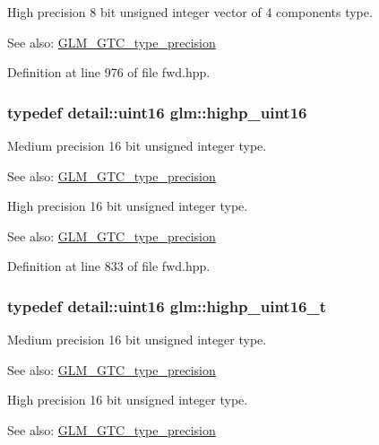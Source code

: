 High precision 8 bit unsigned integer vector of 4 components type. \begin{Desc}
\item[See also:]\hyperlink{group__gtc__type__precision}{GLM\_\-GTC\_\-type\_\-precision} \end{Desc}


Definition at line 976 of file fwd.hpp.\hypertarget{group__gtc__type__precision_g4d32967d45ba8365e2a05eaaac85e978}{
\subsubsection[highp\_\-uint16]{\setlength{\rightskip}{0pt plus 5cm}typedef detail::uint16 {\bf glm::highp\_\-uint16}}}
\label{group__gtc__type__precision_g4d32967d45ba8365e2a05eaaac85e978}


Medium precision 16 bit unsigned integer type. \begin{Desc}
\item[See also:]\hyperlink{group__gtc__type__precision}{GLM\_\-GTC\_\-type\_\-precision}\end{Desc}
High precision 16 bit unsigned integer type. \begin{Desc}
\item[See also:]\hyperlink{group__gtc__type__precision}{GLM\_\-GTC\_\-type\_\-precision} \end{Desc}


Definition at line 833 of file fwd.hpp.\hypertarget{group__gtc__type__precision_g3145bc0ee80432c165e985a188a722b3}{
\subsubsection[highp\_\-uint16\_\-t]{\setlength{\rightskip}{0pt plus 5cm}typedef detail::uint16 {\bf glm::highp\_\-uint16\_\-t}}}
\label{group__gtc__type__precision_g3145bc0ee80432c165e985a188a722b3}


Medium precision 16 bit unsigned integer type. \begin{Desc}
\item[See also:]\hyperlink{group__gtc__type__precision}{GLM\_\-GTC\_\-type\_\-precision}\end{Desc}
High precision 16 bit unsigned integer type. \begin{Desc}
\item[See also:]\hyperlink{group__gtc__type__precision}{GLM\_\-GTC\_\-type\_\-precision} \end{Desc}


